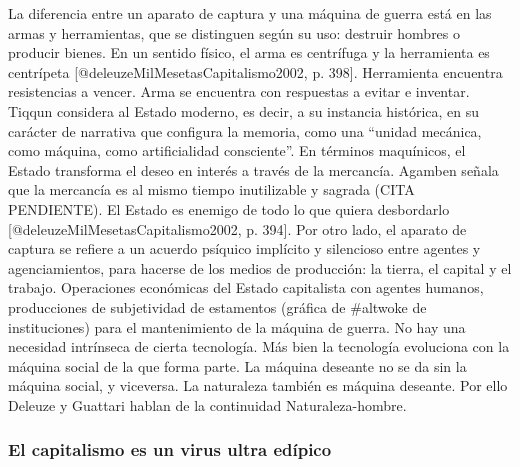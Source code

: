 \documentclass[
]{article}
\begin{document}
La diferencia entre un aparato de captura y una máquina de guerra está
en las armas y herramientas, que se distinguen según su uso: destruir
hombres o producir bienes. En un sentido físico, el arma es centrífuga y
la herramienta es centrípeta {[}@deleuzeMilMesetasCapitalismo2002, p.
398{]}. Herramienta encuentra resistencias a vencer. Arma se encuentra
con respuestas a evitar e inventar. Tiqqun considera al Estado moderno,
es decir, a su instancia histórica, en su carácter de narrativa que
configura la memoria, como una ``unidad mecánica, como máquina, como
artificialidad consciente''. En términos maquínicos, el Estado
transforma el deseo en interés a través de la mercancía. Agamben señala
que la mercancía es al mismo tiempo inutilizable y sagrada (CITA
PENDIENTE). El Estado es enemigo de todo lo que quiera desbordarlo
{[}@deleuzeMilMesetasCapitalismo2002, p. 394{]}. Por otro lado, el
aparato de captura se refiere a un acuerdo psíquico implícito y
silencioso entre agentes y agenciamientos, para hacerse de los medios de
producción: la tierra, el capital y el trabajo. Operaciones económicas
del Estado capitalista con agentes humanos, producciones de subjetividad
de estamentos (gráfica de \#altwoke de instituciones) para el
mantenimiento de la máquina de guerra. No hay una necesidad intrínseca
de cierta tecnología. Más bien la tecnología evoluciona con la máquina
social de la que forma parte. La máquina deseante no se da sin la
máquina social, y viceversa. La naturaleza también es máquina deseante.
Por ello Deleuze y Guattari hablan de la continuidad Naturaleza-hombre.

\hypertarget{el-capitalismo-es-un-virus-ultra-eduxedpico}{%
\subsubsection{El capitalismo es un virus ultra
edípico}\label{el-capitalismo-es-un-virus-ultra-eduxedpico}}
\end{document}
